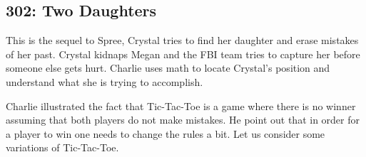 \newpage
\subsection{302: Two Daughters\label{302}}

This is the sequel to Spree, Crystal tries to find her daughter and erase mistakes of her past. Crystal kidnaps Megan and the FBI team tries to capture her before someone else gets hurt. Charlie uses math to locate Crystal's position and understand what she is trying to accomplish. \\



Charlie illustrated the fact that Tic-Tac-Toe is a game where there is no winner assuming that both players do not make mistakes. He point out that in order for a player to win one needs to change the rules a bit. Let us consider some variations of Tic-Tac-Toe. \\

 \vspace{0.2cm}


